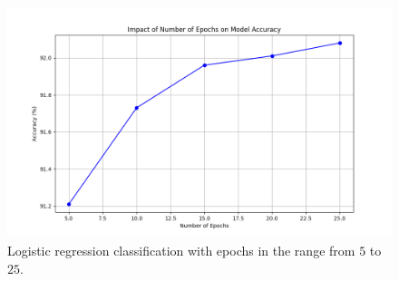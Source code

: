 \begin{figure}[H]
    \centering
    \includegraphics[width=\textwidth]{results/number_of_epochs_study.png}
    \caption{Logistic regression classification with epochs in the range from $5$ to $25$.}
    \label{fig:LogRegEpochs}
\end{figure}
